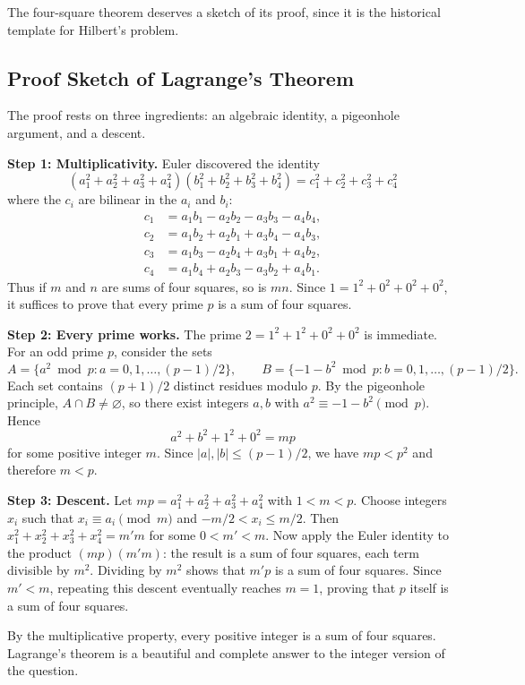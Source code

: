 The four-square theorem deserves a sketch of its proof, since it is the historical template for Hilbert's problem.

\subsection{Proof Sketch of Lagrange's Theorem}

The proof rests on three ingredients: an algebraic identity, a pigeonhole argument, and a descent.

\textbf{Step 1: Multiplicativity.} Euler discovered the identity
\[
    (a_1^2 + a_2^2 + a_3^2 + a_4^2)(b_1^2 + b_2^2 + b_3^2 + b_4^2) = c_1^2 + c_2^2 + c_3^2 + c_4^2
\]
where the $c_i$ are bilinear in the $a_i$ and $b_i$:
\begin{align*}
    c_1 &= a_1 b_1 - a_2 b_2 - a_3 b_3 - a_4 b_4,\\
    c_2 &= a_1 b_2 + a_2 b_1 + a_3 b_4 - a_4 b_3,\\
    c_3 &= a_1 b_3 - a_2 b_4 + a_3 b_1 + a_4 b_2,\\
    c_4 &= a_1 b_4 + a_2 b_3 - a_3 b_2 + a_4 b_1.
\end{align*}
Thus if $m$ and $n$ are sums of four squares, so is $mn$. Since $1 = 1^2 + 0^2 + 0^2 + 0^2$, it suffices to prove that every prime $p$ is a sum of four squares.

\textbf{Step 2: Every prime works.} The prime $2 = 1^2 + 1^2 + 0^2 + 0^2$ is immediate. For an odd prime $p$, consider the sets
\[
    A = \{a^2 \bmod p : a = 0,1,\ldots,(p-1)/2\},\qquad
    B = \{-1-b^2 \bmod p : b = 0,1,\ldots,(p-1)/2\}.
\]
Each set contains $(p+1)/2$ distinct residues modulo $p$. By the pigeonhole principle, $A \cap B \neq \varnothing$, so there exist integers $a,b$ with $a^2 \equiv -1-b^2 \pmod{p}$. Hence
\[
    a^2 + b^2 + 1^2 + 0^2 = mp
\]
for some positive integer $m$. Since $|a|,|b| \leq (p-1)/2$, we have $mp < p^2$ and therefore $m < p$.

\textbf{Step 3: Descent.} Let $mp = a_1^2 + a_2^2 + a_3^2 + a_4^2$ with $1 < m < p$. Choose integers $x_i$ such that $x_i \equiv a_i \pmod{m}$ and $-m/2 < x_i \leq m/2$. Then $x_1^2 + x_2^2 + x_3^2 + x_4^2 = m'm$ for some $0 < m' < m$. Now apply the Euler identity to the product $(mp)(m'm)$: the result is a sum of four squares, each term divisible by $m^2$. Dividing by $m^2$ shows that $m'p$ is a sum of four squares. Since $m' < m$, repeating this descent eventually reaches $m = 1$, proving that $p$ itself is a sum of four squares.

By the multiplicative property, every positive integer is a sum of four squares. Lagrange's theorem is a beautiful and complete answer to the integer version of the question.

